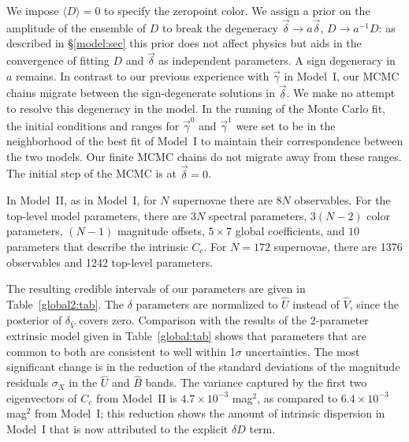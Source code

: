 \documentclass{aastex61}   	%
\begin{document}
We impose
$\langle D\rangle=0$
to specify the zeropoint color.  We assign a prior on the amplitude of the ensemble of $D$ to break the
degeneracy $\vec{\delta} \rightarrow a\vec{\delta}$, $D \rightarrow a^{-1}D$: as described
in \S\ref{model:sec} this prior does not affect physics but aids in the convergence of fitting $D$ and $\vec{\delta}$ as independent parameters.
A sign degeneracy in $a$ remains.
In contrast to our previous experience with $\vec{\gamma}$ in Model~I, our MCMC chains migrate between
the sign-degenerate solutions in  $\vec{\delta}$.  We make
no attempt to resolve this degeneracy in the model.
In the running of the Monte Carlo fit, the initial conditions and ranges for
$\vec{\gamma}^0$ and $\vec{\gamma}^1$ were set to be in the neighborhood of the best fit of Model~I
to maintain their correspondence between the two models.
Our finite MCMC chains do not migrate away from these ranges.
The
initial step of the MCMC is at $\vec{\delta}=0$.

In Model~II,
as in Model~I,
for $N$ supernovae there are $8N$ observables.  For the top-level model parameters, there are $3N$ spectral parameters, $3(N-2)$
color parameters, $(N-1)$ magnitude offsets,  $5 \times 7$ global coefficients, and $10$ parameters that describe the intrinsic
$C_c$.  For $N=172$ supernovae, there are 1376 observables and 1242 top-level parameters.

The resulting credible intervals of our parameters are given in Table~\ref{global2:tab}.  
\color{blue}
The $\delta$ parameters are normalized to $\hat{U}$ instead of $\hat{V}$, since the posterior of $\delta_{\hat{V}}$ covers zero.
\color{black}
Comparison with the
results of the 2-parameter extrinsic model given in Table~\ref{global:tab} shows that  parameters that are common to both
are consistent  to well within 1$\sigma$ uncertainties.  The most significant change is in the reduction of the standard
deviations of the magnitude residuals $\sigma_X$
in the ${\hat{U}}$ and ${\hat{B}}$ bands.
\color{blue}
The variance captured by the first two eigenvectors of $C_c$ from Model~II is $4.7 \times 10^{-3}$ mag$^2$, as
compared to  $6.4 \times 10^{-3}$ mag$^2$ from Model~I; this reduction shows the amount of intrinsic dispersion in Model~I
that  is now attributed to the explicit $\delta D$ term.
\color{black}
\end{document}

